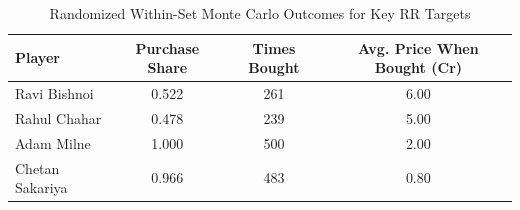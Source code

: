 \begin{table}[H]
\centering
\caption{Randomized Within-Set Monte Carlo Outcomes for Key RR Targets}
\begin{tabular}{lccc}
\toprule
Player & Purchase Share & Times Bought & Avg. Price When Bought (Cr) \\
\midrule
Ravi Bishnoi & 0.522 & 261 & 6.00 \\
Rahul Chahar & 0.478 & 239 & 5.00 \\
Adam Milne & 1.000 & 500 & 2.00 \\
Chetan Sakariya & 0.966 & 483 & 0.80 \\
\bottomrule
\end{tabular}
\end{table}
